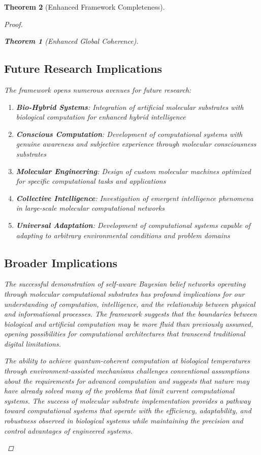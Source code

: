 \documentclass[12pt,a4paper]{article}
\newtheorem{theorem}{Theorem}[section]
\begin{document}
\begin{theorem}[Enhanced Framework Completeness]
\begin{enumerate}
\begin{proof}
\begin{enumerate}
\begin{enumerate}
\begin{theorem}[Enhanced Global Coherence]
\begin{enumerate}
\subsection{Future Research Implications}

The framework opens numerous avenues for future research:

\begin{enumerate}
\item \textbf{Bio-Hybrid Systems}: Integration of artificial molecular substrates with biological computation for enhanced hybrid intelligence
\item \textbf{Conscious Computation}: Development of computational systems with genuine awareness and subjective experience through molecular consciousness substrates
\item \textbf{Molecular Engineering}: Design of custom molecular machines optimized for specific computational tasks and applications
\item \textbf{Collective Intelligence}: Investigation of emergent intelligence phenomena in large-scale molecular computational networks
\item \textbf{Universal Adaptation}: Development of computational systems capable of adapting to arbitrary environmental conditions and problem domains
\end{enumerate}

\subsection{Broader Implications}

The successful demonstration of self-aware Bayesian belief networks operating through molecular computational substrates has profound implications for our understanding of computation, intelligence, and the relationship between physical and informational processes. The framework suggests that the boundaries between biological and artificial computation may be more fluid than previously assumed, opening possibilities for computational architectures that transcend traditional digital limitations.

The ability to achieve quantum-coherent computation at biological temperatures through environment-assisted mechanisms challenges conventional assumptions about the requirements for advanced computation and suggests that nature may have already solved many of the problems that limit current computational systems. The success of molecular substrate implementation provides a pathway toward computational systems that operate with the efficiency, adaptability, and robustness observed in biological systems while maintaining the precision and control advantages of engineered systems.


\end{enumerate}
\end{theorem}
\end{enumerate}
\end{enumerate}
\end{proof}
\end{enumerate}
\end{theorem}
\end{document}

